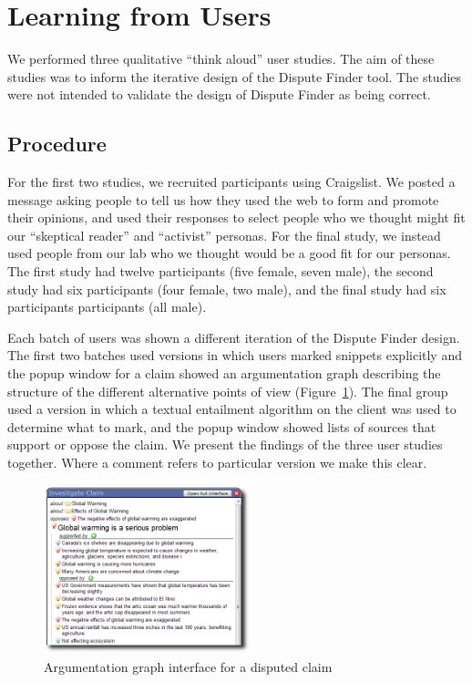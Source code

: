 \documentclass{www2010-submission}
\begin{document}
\section{Learning from Users}

We performed three qualitative ``think aloud'' user studies. The aim of these studies was to inform the iterative design of the Dispute Finder tool. The studies were not intended to validate the design of Dispute Finder as being correct. 

\subsection{Procedure}

For the first two studies, we recruited participants using Craigslist. We posted a message asking people to tell us how they used the web to form and promote their opinions, and used their responses to select people who we thought might fit our ``skeptical reader'' and ``activist'' personas. For the final study, we instead used people from our lab who we thought would be a good fit for our personas. The first study had twelve participants (five female, seven male), the second study had six participants (four female, two male), and the final study had six participants participants (all male). 

Each batch of users was shown a different iteration of the Dispute Finder design. The first two batches used versions in which users marked snippets explicitly and the popup window for a claim showed an argumentation graph describing the structure of the different alternative points of view (Figure~\ref{popup_graph}). The final group used a version in which a textual entailment algorithm on the client was used to determine what to mark, and the popup window showed lists of sources that support or oppose the claim. We present the findings of the three user studies together. Where a comment refers to particular version we make this clear.

\begin{figure}[tb]
	\begin{center}
	\includegraphics[width=6cm]{pictures/popup_graph_crop.png}
	\caption{Argumentation graph interface for a disputed claim}
	\label{popup_graph}
	\end{center}
\end{figure}
\end{document}
